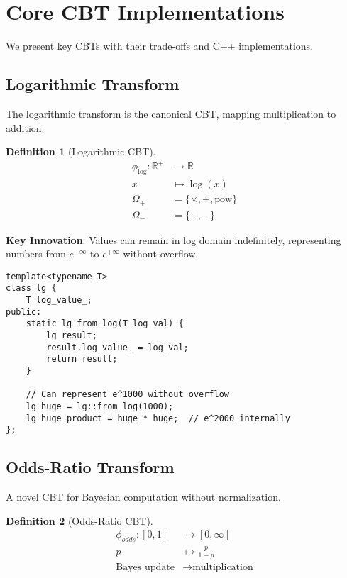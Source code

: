 \documentclass[12pt,a4paper]{article}
\theoremstyle{definition}
\newtheorem{definition}{Definition}
\begin{document}
\section{Core CBT Implementations}

We present key CBTs with their trade-offs and C++ implementations.

\subsection{Logarithmic Transform}

The logarithmic transform is the canonical CBT, mapping multiplication to addition.

\begin{definition}[Logarithmic CBT]
\begin{align}
\phi_{\log}: \mathbb{R}^+ &\to \mathbb{R} \\
x &\mapsto \log(x) \\
\Omega_+ &= \{\times, \div, \text{pow}\} \\
\Omega_- &= \{+, -\}
\end{align}
\end{definition}

\textbf{Key Innovation}: Values can remain in log domain indefinitely, representing numbers from $e^{-\infty}$ to $e^{+\infty}$ without overflow.

\begin{lstlisting}[caption={Extended range in logarithmic domain}]
template<typename T>
class lg {
    T log_value_;
public:
    static lg from_log(T log_val) {
        lg result;
        result.log_value_ = log_val;
        return result;
    }
    
    // Can represent e^1000 without overflow
    lg huge = lg::from_log(1000);
    lg huge_product = huge * huge;  // e^2000 internally
};
\end{lstlisting}

\subsection{Odds-Ratio Transform}

A novel CBT for Bayesian computation without normalization.

\begin{definition}[Odds-Ratio CBT]
\begin{align}
\phi_{odds}: [0,1] &\to [0,\infty] \\
p &\mapsto \frac{p}{1-p} \\
\text{Bayes update} &\to \text{multiplication}
\end{align}
\end{definition}
\end{document}
